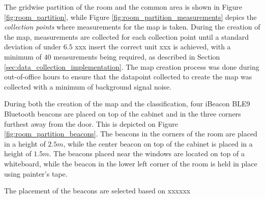 The gridwise partition of the room and the common area is shown in Figure \ref{fig:room_partition}, while Figure \ref{fig:room_partition_measurements} depics the \textit{collection points} where measurements for the map is taken.
During the creation of the map, measurements are collected for each collection point until a standard deviation of under $6.5$ xxx insert the correct unit xxx is achieved, with a minimum of $40$ measurements being required, as described in Section \ref{sec:data_collection_implementation}.
The map creation process was done during out-of-office hours to ensure that the datapoint collected to create the map was collected with a minimum of background signal noise.

During both the creation of the map and the classification, four iBeacon BLE9 Bluetooth beacons \cite{BluetoothiBeaconBLE9} are placed on top of the cabinet and in the three corners furthest away from the door. This is depicted on Figure \ref{fig:room_partition_beacons}.
The beacons in the corners of the room are placed in a height of $2.5m$, while the center beacon on top of the cabinet is placed in a height of $1.5m$.
The beacons placed near the windows are located on top of a whiteboard, while the beacon in the lower left corner of the room is held in place using painter's tape.

The placement of the beacons are selected based on xxxxxx





